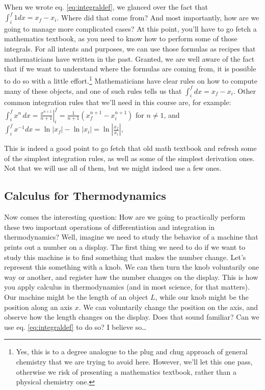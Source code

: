 \documentclass[
  9pt,
]{extbook}
\theoremstyle{definition}
\theoremstyle{definition}
\theoremstyle{definition}
\theoremstyle{remark}
\begin{document}
When we wrote eq. \eqref{eq:integraldef}, we glanced over the fact that \(\int_{i}^{f} 1 dx = x_f-x_i\). Where did that come from? And most importantly, how are we going to manage more complicated cases? At this point, you'll have to go fetch a mathematics textbook, as you need to know how to perform some of those integrals. For all intents and purposes, we can use those formulas as recipes that mathematicians have written in the past. Granted, we are well aware of the fact that if we want to understand where the formulas are coming from, it is possible to do so with a little effort.\footnote{Yes, this is to a degree analogue to the plug and chug approach of general chemistry that we are trying to avoid here. However, we'll let this one pass, otherwise we risk of presenting a mathematics textbook, rather than a physical chemistry one.} Mathematicians have clear rules on how to compute many of these objects, and one of such rules tells us that \(\int_{i}^{f} dx = x_f-x_i\). Other common integration rules that we'll need in this course are, for example: \(\int_{i}^{f} x^{n}\,dx=\left.\frac{x^{n+1}}{n+1}\right| _i^f =\frac{1}{n+1}\left(x_f^{n+1}-x_i^{n+1}\right)\) for \(n\neq 1\), and \(\int_{i}^{f} x^{-1} dx=\ln \left|x_f\right|-\ln \left|x_i\right|=\ln \left|\frac{x_f}{x_i}\right|,\)

This is indeed a good point to go fetch that old math textbook and refresh some of the simplest integration rules, as well as some of the simplest derivation ones. Not that we will use all of them, but we might indeed use a few ones.

\hypertarget{calculus-for-thermodynamics}{%
\subsection{Calculus for Thermodynamics}\label{calculus-for-thermodynamics}}

Now comes the interesting question: How are we going to practically perform these two important operations of differentiation and integration in thermodynamics? Well, imagine we need to study the behavior of a machine that prints out a number on a display. The first thing we need to do if we want to study this machine is to find something that makes the number change. Let's represent this something with a knob. We can then turn the knob voluntarily one way or another, and register haw the number changes on the display. This is how you apply calculus in thermodynamics (and in most science, for that matters). Our machine might be the length of an object \(L\), while our knob might be the position along an axis \(x\). We can voluntarily change the position on the axis, and observe how the length changes on the display. Does that sound familiar? Can we use eq. \eqref{eq:integraldef} to do so? I believe so\ldots{}
\end{document}
